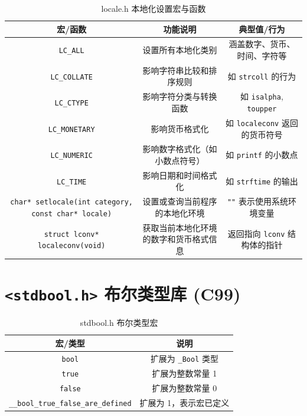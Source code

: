 \begin{table}[H]
\centering
\small
\renewcommand{\arraystretch}{1.5}
\begin{tabulary}{\linewidth}{CCC}
\toprule
\textbf{宏/函数} & \textbf{功能说明} & \textbf{典型值/行为} \\ \midrule
\texttt{LC\_ALL} & 设置所有本地化类别 & 涵盖数字、货币、时间、字符等 \\ 
\texttt{LC\_COLLATE} & 影响字符串比较和排序规则 & 如 \texttt{strcoll} 的行为 \\ 
\texttt{LC\_CTYPE} & 影响字符分类与转换函数 & 如 \texttt{isalpha}, \texttt{toupper} \\ 
\texttt{LC\_MONETARY} & 影响货币格式化 & 如 \texttt{localeconv} 返回的货币符号 \\ 
\texttt{LC\_NUMERIC} & 影响数字格式化（如小数点符号） & 如 \texttt{printf} 的小数点 \\ 
\texttt{LC\_TIME} & 影响日期和时间格式化 & 如 \texttt{strftime} 的输出 \\ 
\texttt{char* setlocale(int category, const char* locale)} & 设置或查询当前程序的本地化环境 & \texttt{""} 表示使用系统环境变量 \\ 
\texttt{struct lconv* localeconv(void)} & 获取当前本地化环境的数字和货币格式信息 & 返回指向 \texttt{lconv} 结构体的指针 \\ \bottomrule
\end{tabulary}
\caption{locale.h 本地化设置宏与函数}
\label{tab:locale}
\end{table}

\section{\texorpdfstring{\texttt{<stdbool.h>} 布尔类型库 (C99)}{<stdbool.h> 布尔类型库 (C99)}}

\begin{table}[H]
\centering
\small
\renewcommand{\arraystretch}{1.5}
\begin{tabulary}{\linewidth}{CC}
\toprule
\textbf{宏/类型} & \textbf{说明} \\ \midrule
\texttt{bool} & 扩展为 \texttt{\_Bool} 类型 \\ 
\texttt{true} & 扩展为整数常量 1 \\ 
\texttt{false} & 扩展为整数常量 0 \\ 
\texttt{\_\_bool\_true\_false\_are\_defined} & 扩展为 1，表示宏已定义 \\ \bottomrule
\end{tabulary}
\caption{stdbool.h 布尔类型宏}
\label{tab:stdbool}
\end{table}

